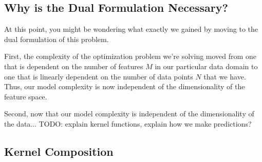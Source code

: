 \subsection{Why is the Dual Formulation Necessary?}
At this point, you might be wondering what exactly we gained by moving to the dual formulation of this problem.

First, the complexity of the optimization problem we're solving moved from one that is dependent on the number of features $M$ in our particular data domain to one that is linearly dependent on the number of data points $N$ that we have. Thus, our model complexity is now independent of the dimensionality of the feature space.

Second, now that our model complexity is independent of the dimensionality of the data... TODO: explain kernel functions, explain how we make predictions?

\subsection{Kernel Composition}

